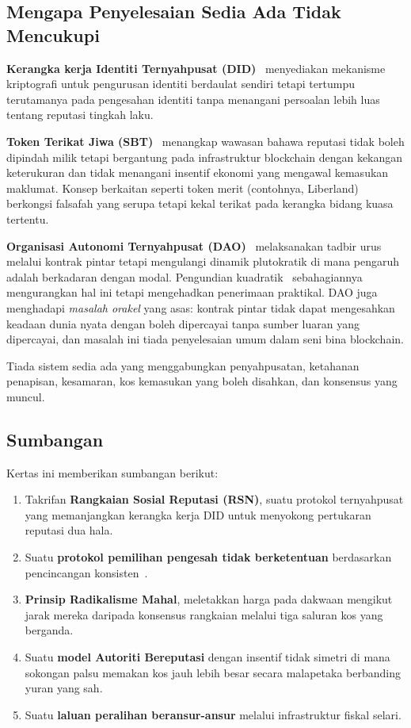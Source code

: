 \documentclass[11pt,a4paper,twocolumn]{article}
\begin{document}
\subsection{Mengapa Penyelesaian Sedia Ada Tidak Mencukupi}

\textbf{Kerangka kerja Identiti Ternyahpusat (DID)}~\cite{did2022} menyediakan mekanisme kriptografi untuk pengurusan identiti berdaulat sendiri tetapi tertumpu terutamanya pada pengesahan identiti tanpa menangani persoalan lebih luas tentang reputasi tingkah laku.

\textbf{Token Terikat Jiwa (SBT)}~\cite{weyl2022} menangkap wawasan bahawa reputasi tidak boleh dipindah milik tetapi bergantung pada infrastruktur blockchain dengan kekangan keterukuran dan tidak menangani insentif ekonomi yang mengawal kemasukan maklumat. Konsep berkaitan seperti token merit (contohnya, Liberland) berkongsi falsafah yang serupa tetapi kekal terikat pada kerangka bidang kuasa tertentu.

\textbf{Organisasi Autonomi Ternyahpusat (DAO)}~\cite{buterin2014} melaksanakan tadbir urus melalui kontrak pintar tetapi mengulangi dinamik plutokratik di mana pengaruh adalah berkadaran dengan modal. Pengundian kuadratik~\cite{buterin2019} sebahagiannya mengurangkan hal ini tetapi mengehadkan penerimaan praktikal. DAO juga menghadapi \emph{masalah orakel} yang asas: kontrak pintar tidak dapat mengesahkan keadaan dunia nyata dengan boleh dipercayai tanpa sumber luaran yang dipercayai, dan masalah ini tiada penyelesaian umum dalam seni bina blockchain.

Tiada sistem sedia ada yang menggabungkan penyahpusatan, ketahanan penapisan, kesamaran, kos kemasukan yang boleh disahkan, dan konsensus yang muncul.

\subsection{Sumbangan}

Kertas ini memberikan sumbangan berikut:
\begin{enumerate}[nosep]
\item Takrifan \textbf{Rangkaian Sosial Reputasi (RSN)}, suatu protokol ternyahpusat yang memanjangkan kerangka kerja DID untuk menyokong pertukaran reputasi dua hala.
\item Suatu \textbf{protokol pemilihan pengesah tidak berketentuan} berdasarkan pencincangan konsisten~\cite{karger1997}.
\item \textbf{Prinsip Radikalisme Mahal}, meletakkan harga pada dakwaan mengikut jarak mereka daripada konsensus rangkaian melalui tiga saluran kos yang berganda.
\item Suatu \textbf{model Autoriti Bereputasi} dengan insentif tidak simetri di mana sokongan palsu memakan kos jauh lebih besar secara malapetaka berbanding yuran yang sah.
\item Suatu \textbf{laluan peralihan beransur-ansur} melalui infrastruktur fiskal selari.
\end{enumerate}
\end{document}
